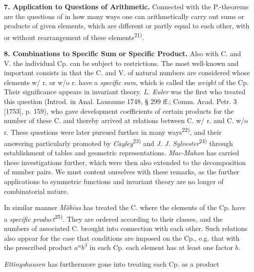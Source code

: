 \thispagestyle{fancy}

\vspace{0.5cm}

\textbf{7. Application to Questions of Arithmetic.} Connected with the P.-theorems are the questions of in how many ways one can arithmetically carry out sums or products of given elements, which are different or partly equal to each other, with or without rearrangement of these elements\textsuperscript{21)}.

\vspace{0.2cm}

\textbf{8. Combinations to Specific Sum or Specific Product.} Also with C. and V. the individual Cp. can be subject to restrictions. The most well-known and important consists in that the C. and V. of natural numbers are considered whose elements w/ r. or w/o r. have a \textit{specific sum}, which is called the \textit{weight} of the Cp. Their significance appears in invariant theory. \textit{L. Euler} was the first who treated this question (Introd. in Anal. Lausanne 1748, § 299 ff.; Comm. Acad. Petr. 3 [1753], p. 159), who gave development coefficients of certain products for the number of these C. and thereby arrived at relations between C. w/ r. and C. w/o r. These questions were later pursued further in many ways\textsuperscript{22)}, and their answering particularly promoted by \textit{Cayley}\textsuperscript{23)} and \textit{J. J. Sylvester}\textsuperscript{24)} through establishment of tables and geometric representations. \textit{Mac-Mahon} has carried these investigations further, which were then also extended to the decomposition of number pairs. We must content ourselves with these remarks, as the further applications to symmetric functions and invariant theory are no longer of combinatorial nature.

In similar manner \textit{Möbius} has treated the C. where the elements of the Cp. have a \textit{specific product}\textsuperscript{25)}. They are ordered according to their classes, and the numbers of associated C. brought into connection with each other. Such relations also appear for the case that conditions are imposed on the Cp., e.g. that with the prescribed product $a^\alpha b^\beta$ in each Cp. each element has at least one factor $b$.

\textit{Ettingshausen} has furthermore gone into treating each Cp. as a product

